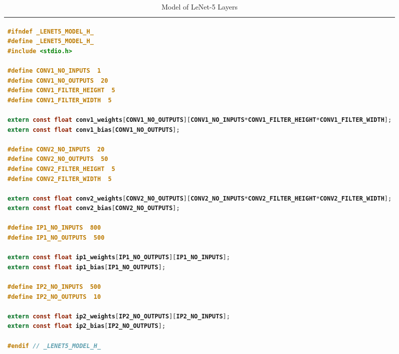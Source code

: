 \lstset{framesep=-5pt, xleftmargin=-5pt}

\begin{table}[!h]
\centering
\caption{Model of LeNet-5 Layers }
\label{riscvcode1:tb}
\begin{tabular}{l}
\toprule
\begin{lstlisting}[columns=fullflexible, language=C]
#ifndef _LENET5_MODEL_H_
#define _LENET5_MODEL_H_
#include <stdio.h>

#define CONV1_NO_INPUTS  1
#define CONV1_NO_OUTPUTS  20
#define CONV1_FILTER_HEIGHT  5
#define CONV1_FILTER_WIDTH  5

extern const float conv1_weights[CONV1_NO_OUTPUTS][CONV1_NO_INPUTS*CONV1_FILTER_HEIGHT*CONV1_FILTER_WIDTH];
extern const float conv1_bias[CONV1_NO_OUTPUTS];

#define CONV2_NO_INPUTS  20
#define CONV2_NO_OUTPUTS  50
#define CONV2_FILTER_HEIGHT  5
#define CONV2_FILTER_WIDTH  5

extern const float conv2_weights[CONV2_NO_OUTPUTS][CONV2_NO_INPUTS*CONV2_FILTER_HEIGHT*CONV2_FILTER_WIDTH];
extern const float conv2_bias[CONV2_NO_OUTPUTS];

#define IP1_NO_INPUTS  800
#define IP1_NO_OUTPUTS  500

extern const float ip1_weights[IP1_NO_OUTPUTS][IP1_NO_INPUTS];
extern const float ip1_bias[IP1_NO_OUTPUTS];

#define IP2_NO_INPUTS  500
#define IP2_NO_OUTPUTS  10

extern const float ip2_weights[IP2_NO_OUTPUTS][IP2_NO_INPUTS];
extern const float ip2_bias[IP2_NO_OUTPUTS];

#endif // _LENET5_MODEL_H_
\end{lstlisting}
\\
\bottomrule
\end{tabular}
\end{table}
